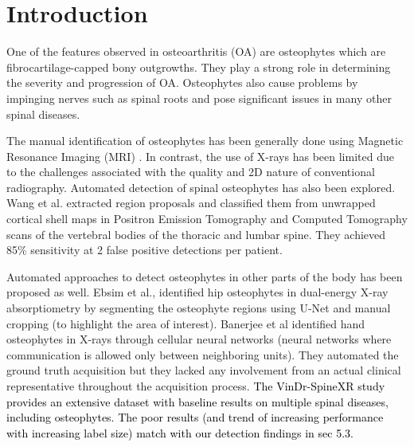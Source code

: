 \documentclass{article}
\newcommand{\final}[1]{\textcolor{black}{#1}}
\begin{document}
\section{Introduction}
\label{sec:intro}
One of the features observed in osteoarthritis (OA) \cite{van2007osteophytes} are osteophytes which are  fibrocartilage-capped  bony outgrowths. They play a strong role in determining the severity and progression of OA. Osteophytes also cause problems by impinging nerves such as spinal roots \cite{jones2012l5} and pose significant issues in many other spinal diseases.
\par
The manual identification of osteophytes has been generally done using
Magnetic Resonance Imaging (MRI) \cite{tozawa2021possible}. In contrast, the use of X-rays has been limited due to the challenges associated with the quality and 2D nature of conventional radiography. 
Automated detection of spinal osteophytes has also been explored. 
Wang et al. \cite{wang2016detection} extracted region proposals and classified them from unwrapped cortical shell maps in Positron Emission Tomography and Computed Tomography scans of the vertebral bodies of the thoracic and lumbar spine. 
They achieved 85\% sensitivity at 2 false positive detections per patient. 

Automated approaches to detect osteophytes in other parts of the body has been proposed as well. 
Ebsim et al., \cite{ebsim2022automatic} identified hip osteophytes in dual-energy X-ray absorptiometry by segmenting the osteophyte regions using U-Net \cite{ronneberger2015u} and manual cropping (to highlight the area of interest). 
Banerjee et al \cite{banerjee2011osteophyte} identified hand osteophytes in X-rays through cellular neural networks (neural networks where communication is allowed only between neighboring units). They automated the ground truth acquisition but they lacked any involvement  from an actual clinical representative throughout the acquisition process. 
\final{The VinDr-SpineXR study \cite{nguyen2021vindr} provides an extensive dataset with baseline results on multiple spinal diseases, including osteophytes. The poor results (and trend of increasing performance with increasing label size) match with our detection findings in sec 5.3.}
\end{document}
